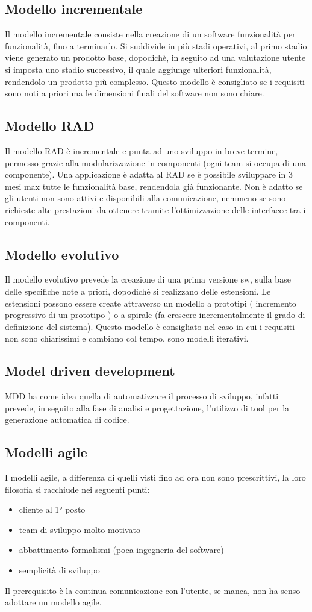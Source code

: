 \documentclass[a4paper,12pt]{report}
\begin{document}
	\subsection{Modello incrementale}
	 Il modello incrementale consiste nella creazione di un software funzionalità per funzionalità, fino a terminarlo. Si suddivide in più stadi operativi, al primo stadio viene generato un prodotto base, dopodichè, in seguito ad una valutazione utente si imposta uno stadio successivo, il quale aggiunge ulteriori funzionalità, rendendolo un prodotto più complesso. Questo modello è consigliato se i requisiti sono noti a priori ma le dimensioni finali del software non sono chiare.
	 \subsection{Modello RAD}
	 Il modello RAD è incrementale e punta ad uno sviluppo in breve termine, permesso grazie alla modularizzazione in componenti (ogni team si occupa di una componente). Una applicazione è adatta al RAD se è possibile sviluppare in 3 mesi max tutte le funzionalità base, rendendola già funzionante. Non è adatto se gli utenti non sono attivi e disponibili alla comunicazione, nemmeno se sono richieste alte prestazioni da ottenere tramite l'ottimizzazione delle interfacce tra i componenti.
	 \subsection{Modello evolutivo}
	 Il modello evolutivo prevede la creazione di una prima versione sw, sulla base delle specifiche note a priori, dopodichè si realizzano delle estensioni. Le estensioni possono essere create attraverso un modello a prototipi ( incremento progressivo di un prototipo ) o a spirale (fa crescere incrementalmente il grado di definizione del sistema). Questo modello è consigliato nel caso in cui i requisiti non sono chiarissimi e cambiano col tempo, sono modelli iterativi.
	 \subsection{Model driven development}
	 MDD ha come idea quella di automatizzare il processo di sviluppo, infatti prevede, in seguito alla fase di analisi e progettazione, l'utilizzo di tool per la generazione automatica di codice.
	 \subsection{Modelli agile}
	 I modelli agile, a differenza di quelli visti fino ad ora non sono prescrittivi, la loro filosofia si racchiude nei seguenti punti:
	 \begin{itemize}
	 	\item cliente al 1° posto
	 	\item team di sviluppo molto motivato
	 	\item abbattimento formalismi (poca ingegneria del software)
	 	\item semplicità di sviluppo
	 \end{itemize}
	Il prerequisito è la continua comunicazione con l'utente, se manca, non ha senso adottare un modello agile.
\end{document}
